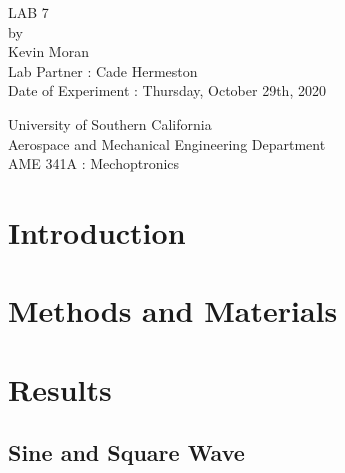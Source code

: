 \documentclass[letterpaper,12pt]{article}
\begin{document}
\begin{titlepage}
 \begin{center}
 \vspace*{1in}
{\Huge LAB 7}\\
    \bigskip
    by\\
    \bigskip
    {\Large Kevin Moran} \\
    \bigskip
    Lab Partner : Cade Hermeston\\
    Date of Experiment : Thursday, October 29th, 2020

    \bigskip\bigskip\bigskip
    University of Southern California\\
    Aerospace and Mechanical Engineering Department\\
    AME 341A : Mechoptronics
 \end{center}
\end{titlepage}
\begin{abstract}
    
\end{abstract}

\section{Introduction}

\section{Methods and Materials}

\section{Results}

\subsection{Sine and Square Wave}
\end{document}

